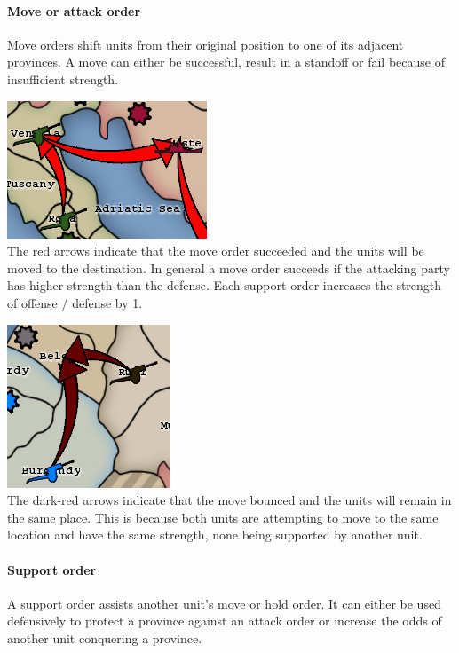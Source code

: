 \documentclass[pdftex,12pt,a4paper]{report}
\begin{document}
\paragraph{Move or attack order} 
Move orders shift units from their original position to one of its
adjacent provinces. A move can either be successful, result in a
standoff or fail because of insufficient strength. 

\includegraphics{./screenshots/Move0.png} \\[1cm]
The red arrows indicate that the move order succeeded and the units
will be moved to the destination. In general a move order succeeds
if the attacking party has higher strength than the defense. Each 
support order increases the strength of offense / defense by 1.


\includegraphics{./screenshots/BouncedMove.png} \\[1cm]
The dark-red arrows indicate that the move bounced and the units will
remain in the same place. This is because both units are attempting 
to move to the same location and have the same strength, none being
supported by another unit.

\paragraph{Support order}
A support order assists another unit's move or hold order. It can
either be used defensively to protect a province against an attack
order or increase the odds of another unit conquering a province.
\end{document}
